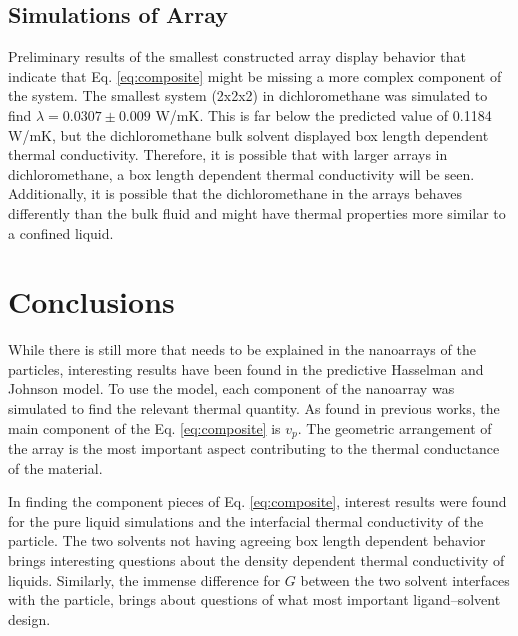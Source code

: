 \subsection{Simulations of Array}
Preliminary results of the smallest constructed array display behavior that indicate that Eq. \ref{eq:composite} might be missing a more complex component of the system.
The smallest system (2x2x2) in dichloromethane was simulated to find $\lambda = 0.0307 \pm 0.009$ W/mK. 
This is far below the predicted value of 0.1184 W/mK, but the dichloromethane bulk solvent displayed box length dependent thermal conductivity.
Therefore, it is possible that with larger arrays in dichloromethane, a box length dependent thermal conductivity will be seen. 
Additionally, it is possible that the dichloromethane in the arrays behaves differently than the bulk fluid and might have thermal properties more similar to a confined liquid.

\section{Conclusions}
While there is still more that needs to be explained in the nanoarrays of the  particles, interesting results have been found in the predictive Hasselman and Johnson model. 
To use the model, each component of the nanoarray was simulated to find the relevant thermal quantity. 
As found in previous works, the main component of the Eq. \ref{eq:composite} is $v_p$. 
The geometric arrangement of the array is the most important aspect contributing to the thermal conductance of the material.

In finding the component pieces of Eq. \ref{eq:composite}, interest results were found for the pure liquid simulations and the interfacial thermal conductivity of the particle.
The two solvents not having agreeing box length dependent behavior brings interesting questions about the density dependent thermal conductivity of liquids.
Similarly, the immense difference for $G$ between the two solvent interfaces with the particle, brings about questions of what most important ligand--solvent design.
